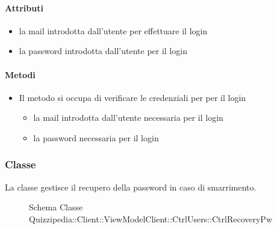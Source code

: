 \paragraph{Attributi}
\begin{itemize}
\item {}
\newline
la mail introdotta dall'utente per effettuare il login
\item {}
\newline
la password introdotta dall'utente per il login
\end{itemize}
\paragraph{Metodi}
\begin{itemize}
\item {}
\newline
Il metodo si occupa di verificare le credenziali per per il login
\newline
{}
\newline
\begin{itemize}
\item {}
\newline
la mail introdotta dall'utente necessaria per il login
\item {}
\newline
la password necessaria per il login
\end{itemize}
\end{itemize}
\subsubsection{Classe }
La classe gestisce il recupero della password in caso di smarrimento.
\begin{figure}[H]
\centering
\noindent{}
\caption[Schema Classe CtrlRecoveryPw]{Schema Classe Quizzipedia::Client::ViewModelClient::CtrlUsers::CtrlRecoveryPw}
\end{figure}
